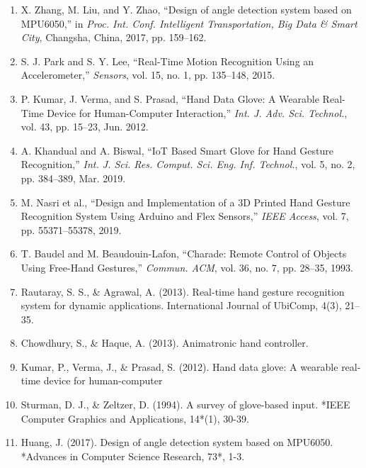 \begin{enumerate}
  \item X. Zhang, M. Liu, and Y. Zhao, “Design of angle detection system based on MPU6050,” in \textit{Proc. Int. Conf. Intelligent Transportation, Big Data \& Smart City}, Changsha, China, 2017, pp. 159–162.
  \item S. J. Park and S. Y. Lee, “Real-Time Motion Recognition Using an Accelerometer,” \textit{Sensors}, vol. 15, no. 1, pp. 135–148, 2015.
  \item P. Kumar, J. Verma, and S. Prasad, “Hand Data Glove: A Wearable Real-Time Device for Human-Computer Interaction,” \textit{Int. J. Adv. Sci. Technol.}, vol. 43, pp. 15–23, Jun. 2012.
  \item A. Khandual and A. Biswal, “IoT Based Smart Glove for Hand Gesture Recognition,” \textit{Int. J. Sci. Res. Comput. Sci. Eng. Inf. Technol.}, vol. 5, no. 2, pp. 384–389, Mar. 2019.
  \item M. Nasri et al., “Design and Implementation of a 3D Printed Hand Gesture Recognition System Using Arduino and Flex Sensors,” \textit{IEEE Access}, vol. 7, pp. 55371–55378, 2019.
  \item T. Baudel and M. Beaudouin-Lafon, “Charade: Remote Control of Objects Using Free-Hand Gestures,” \textit{Commun. ACM}, vol. 36, no. 7, pp. 28–35, 1993.
  \item Rautaray, S. S., \& Agrawal, A. (2013). Real-time hand gesture recognition system       for dynamic applications. International Journal of UbiComp, 4(3), 21–35.
  \item Chowdhury, S., \& Haque, A. (2013). Animatronic hand controller. 
  \item Kumar, P., Verma, J., \& Prasad, S. (2012). Hand data glove: A wearable real-time device for human-computer
  \item Sturman, D. J., \& Zeltzer, D. (1994). A survey of glove-based input. *IEEE Computer Graphics and Applications, 14*(1), 30-39.
  \item Huang, J. (2017). Design of angle detection system based on MPU6050. *Advances in Computer Science Research, 73*, 1-3.
\end{enumerate}